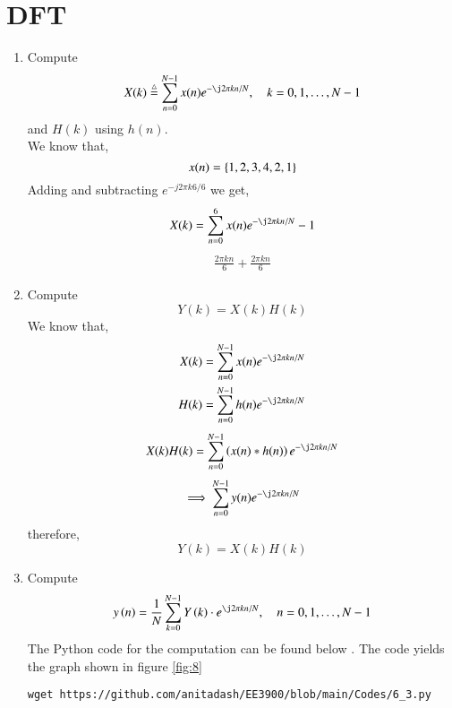 \documentclass[journal,12pt,twocolumn]{IEEEtran}
\renewcommand\thesection{\arabic{section}}
\begin{document}
\section{DFT}
\begin{enumerate}[label=\thesection.\arabic*
,ref=\thesection.\theenumi]
\item
Compute
\begin{equation}
X(k) \define \sum _{n=0}^{N-1}x(n) e^{-\j2\pi kn/N}, \quad k = 0,1,\dots, N-1
\end{equation}
and $H(k)$ using $h(n)$.\\
\solution We know that,
\begin{equation}
x(n) = \left\{1,2,3,4,2,1\right\}
\end{equation}
Adding and subtracting $e^{-j2\pi k6/6}$ we get,
\begin{equation}
X(k) = \sum _{n=0}^{6}x(n) e^{-\j2\pi kn/N} - 1
\end{equation}
\begin{align}
\frac{2\pi kn}{6} + \frac{2\pi kn}{6}
\end{align}
\item Compute 
\begin{equation}
Y(k) = X(k)H(k)
\end{equation}
\solution We know that,
\begin{align}
X(k) = \sum _{n=0}^{N-1}x(n) e^{-\j2\pi kn/N}\\
H(k) = \sum _{n=0}^{N-1}h(n) e^{-\j2\pi kn/N}
\end{align}
\begin{equation}
X(k)H(k)= \sum _{n=0}^{N-1}\brak{x(n)*h(n)} e^{-\j2\pi kn/N}
\end{equation}
\begin{align}
\implies \sum _{n=0}^{N-1}y(n) e^{-\j2\pi kn/N}
\end{align}
therefore, 
\begin{equation}
Y(k) = X(k)H(k)
\end{equation}
\item Compute
\begin{equation}
 y\brak{n}={\frac {1}{N}}\sum _{k=0}^{N-1}Y\brak{k}\cdot e^{\j 2\pi kn/N},\quad n = 0,1,\dots, N-1
\end{equation}
\solution The Python code for the computation can be found below . The code yields the graph shown in figure \ref{fig:8}
\begin{lstlisting}
wget https://github.com/anitadash/EE3900/blob/main/Codes/6_3.py
\end{lstlisting}
\begin{figure}[!ht]

\end{figure}
\end{enumerate}
\end{document}
